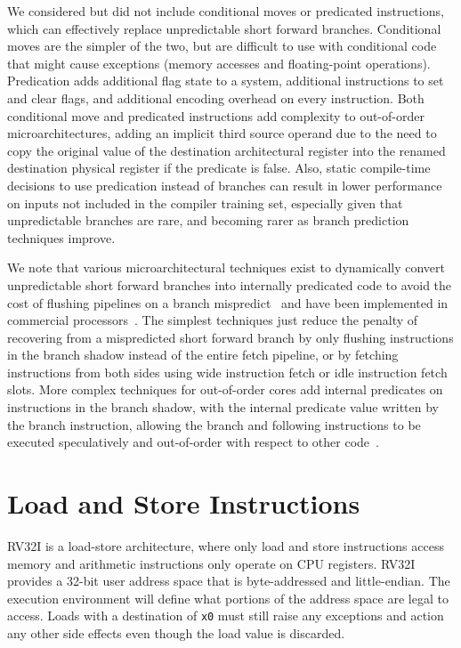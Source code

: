 \begin{commentary}
We considered but did not include conditional moves or predicated
instructions, which can effectively replace unpredictable short
forward branches.  Conditional moves are the simpler of the two, but
are difficult to use with conditional code that might cause exceptions
(memory accesses and floating-point operations).  Predication adds
additional flag state to a system, additional instructions to set and
clear flags, and additional encoding overhead on every instruction.
Both conditional move and predicated instructions add complexity to
out-of-order microarchitectures, adding an implicit third source
operand due to the need to copy the original value of the destination
architectural register into the renamed destination physical register
if the predicate is false.  Also, static compile-time decisions to use
predication instead of branches can result in lower performance on
inputs not included in the compiler training set, especially given
that unpredictable branches are rare, and becoming rarer as branch
prediction techniques improve.

We note that various microarchitectural techniques exist to
dynamically convert unpredictable short forward branches into
internally predicated code to avoid the cost of flushing pipelines on
a branch mispredict~\cite{heil-tr1996,Klauser-1998,Kim-micro2005} and
have been implemented in commercial processors~\cite{ibmpower7}.
The simplest techniques just reduce the penalty of recovering from a
mispredicted short forward branch by only flushing instructions in the
branch shadow instead of the entire fetch pipeline, or by fetching
instructions from both sides using wide instruction fetch or idle
instruction fetch slots.  More complex techniques for out-of-order
cores add internal predicates on instructions in the branch shadow,
with the internal predicate value written by the branch instruction,
allowing the branch and following instructions to be executed
speculatively and out-of-order with respect to other code~\cite{ibmpower7}.
\end{commentary}

\section{Load and Store Instructions}

RV32I is a load-store architecture, where only load and store
instructions access memory and arithmetic instructions only operate on
CPU registers.  RV32I provides a 32-bit user address space that is
byte-addressed and little-endian.  The execution environment will
define what portions of the address space are legal to access.  Loads
with a destination of {\tt x0} must still raise any exceptions and
action any other side effects even though the load value is discarded.

